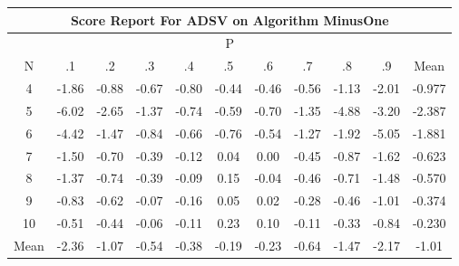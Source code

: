 \documentclass[11pt,a4paper]{report}
\begin{document}
\begin{longtable}{ | c || c | c | c | c | c | c | c | c | c || c |}
\hline
\multicolumn{11}{|c|}{ Score Report For ADSV on Algorithm MinusOne} \\
\hline
\multicolumn{11}{|c|}{ P } \\
\hline
N & .1 & .2 & .3 & .4 & .5 & .6 & .7 & .8 & .9 & Mean\\
 \hline
 \hline
 \endhead
  4 &  \cellcolor[HTML]{FFCFCF} -1.86 &  \cellcolor[HTML]{FFE7E7} -0.88 &  \cellcolor[HTML]{FFEFEF} -0.67 &  \cellcolor[HTML]{FFE7E7} -0.80 &  \cellcolor[HTML]{FFF7F7} -0.44 &  \cellcolor[HTML]{FFF7F7} -0.46 &  \cellcolor[HTML]{FFEFEF} -0.56 &  \cellcolor[HTML]{FFDFDF} -1.13 &  \cellcolor[HTML]{FFCFCF} -2.01 & -0.977 \\
  5 &  \cellcolor[HTML]{FF6868} -6.02 &  \cellcolor[HTML]{FFBFBF} -2.65 &  \cellcolor[HTML]{FFDFDF} -1.37 &  \cellcolor[HTML]{FFEFEF} -0.74 &  \cellcolor[HTML]{FFEFEF} -0.59 &  \cellcolor[HTML]{FFEFEF} -0.70 &  \cellcolor[HTML]{FFDFDF} -1.35 &  \cellcolor[HTML]{FF8787} -4.88 &  \cellcolor[HTML]{FFAFAF} -3.20 & -2.387 \\
  6 &  \cellcolor[HTML]{FF8F8F} -4.42 &  \cellcolor[HTML]{FFD7D7} -1.47 &  \cellcolor[HTML]{FFE7E7} -0.84 &  \cellcolor[HTML]{FFEFEF} -0.66 &  \cellcolor[HTML]{FFEFEF} -0.76 &  \cellcolor[HTML]{FFEFEF} -0.54 &  \cellcolor[HTML]{FFDFDF} -1.27 &  \cellcolor[HTML]{FFCFCF} -1.92 &  \cellcolor[HTML]{FF8080} -5.05 & -1.881 \\
  7 &  \cellcolor[HTML]{FFD7D7} -1.50 &  \cellcolor[HTML]{FFEFEF} -0.70 &  \cellcolor[HTML]{FFF7F7} -0.39 &  \cellcolor[HTML]{FFFFFF} -0.12 &  \cellcolor[HTML]{FFFFFF} 0.04 &  \cellcolor[HTML]{FFFFFF} 0.00 &  \cellcolor[HTML]{FFF7F7} -0.45 &  \cellcolor[HTML]{FFE7E7} -0.87 &  \cellcolor[HTML]{FFD7D7} -1.62 & -0.623 \\
  8 &  \cellcolor[HTML]{FFDFDF} -1.37 &  \cellcolor[HTML]{FFEFEF} -0.74 &  \cellcolor[HTML]{FFF7F7} -0.39 &  \cellcolor[HTML]{FFFFFF} -0.09 &  \cellcolor[HTML]{FFFFFF} 0.15 &  \cellcolor[HTML]{FFFFFF} -0.04 &  \cellcolor[HTML]{FFF7F7} -0.46 &  \cellcolor[HTML]{FFEFEF} -0.71 &  \cellcolor[HTML]{FFD7D7} -1.48 & -0.570 \\
  9 &  \cellcolor[HTML]{FFE7E7} -0.83 &  \cellcolor[HTML]{FFEFEF} -0.62 &  \cellcolor[HTML]{FFFFFF} -0.07 &  \cellcolor[HTML]{FFF7F7} -0.16 &  \cellcolor[HTML]{FFFFFF} 0.05 &  \cellcolor[HTML]{FFFFFF} 0.02 &  \cellcolor[HTML]{FFF7F7} -0.28 &  \cellcolor[HTML]{FFF7F7} -0.46 &  \cellcolor[HTML]{FFE7E7} -1.01 & -0.374 \\
  10 &  \cellcolor[HTML]{FFEFEF} -0.51 &  \cellcolor[HTML]{FFF7F7} -0.44 &  \cellcolor[HTML]{FFFFFF} -0.06 &  \cellcolor[HTML]{FFFFFF} -0.11 &  \cellcolor[HTML]{F7F7FF} 0.23 &  \cellcolor[HTML]{FFFFFF} 0.10 &  \cellcolor[HTML]{FFFFFF} -0.11 &  \cellcolor[HTML]{FFF7F7} -0.33 &  \cellcolor[HTML]{FFE7E7} -0.84 & -0.230 \\
 \hline
 \hline
Mean &  \cellcolor[HTML]{FFC7C7} -2.36 &  \cellcolor[HTML]{FFE7E7} -1.07 &  \cellcolor[HTML]{FFEFEF} -0.54 &  \cellcolor[HTML]{FFF7F7} -0.38 &  \cellcolor[HTML]{FFF7F7} -0.19 &  \cellcolor[HTML]{FFF7F7} -0.23 &  \cellcolor[HTML]{FFEFEF} -0.64 &  \cellcolor[HTML]{FFD7D7} -1.47 &  \cellcolor[HTML]{FFC7C7} -2.17 &  \cellcolor[HTML]{FFE7E7} -1.01
\end{longtable}
\end{document}
